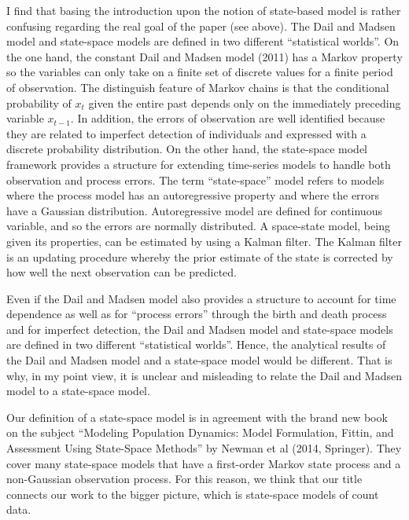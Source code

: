 \documentclass[12pt,english]{article}
\begin{document}
\begin{spacing}{1.9}
\begin{flushleft}
I find that basing the introduction upon the notion of state-based model is rather confusing
regarding the real goal of the paper (see above). The Dail and Madsen model and state-space
models are defined in two different ``statistical worlds''. On the one hand, the constant
Dail and Madsen model (2011) has a Markov property so the variables can only take on a
finite set of discrete values for a finite period of observation. The distinguish feature of
Markov chains is that the conditional probability of $x_{t}$ given the entire past depends only on
the immediately preceding variable $x_{t-1}$. In addition, the errors of observation are well
identified because they are related to imperfect detection of individuals and expressed with
a discrete probability distribution. On the other hand, the state-space model framework
provides a structure for extending time-series models to handle both observation and
process errors. The term ``state-space'' model refers to models where the process model has
an autoregressive property and where the errors have a Gaussian distribution.
Autoregressive model are defined for continuous variable, and so the errors are normally
distributed. A space-state model, being given its properties, can be estimated by using a
Kalman filter. The Kalman filter is an updating procedure whereby the prior estimate of the
state is corrected by how well the next observation can be predicted.

Even if the Dail and Madsen model also provides a structure to account for time dependence
as well as for ``process errors'' through the birth and death process and for imperfect
detection, the Dail and Madsen model and state-space models are defined in two different
``statistical worlds''. Hence, the analytical results of the Dail and Madsen model and a state-space
model would be different. That is why, in my point view, it is unclear and misleading to
relate the Dail and Madsen model to a state-space model.

\vspace{0.5cm}
Our definition of a state-space model is in agreement with the brand new
book on the subject ``Modeling Population Dynamics: Model Formulation,
Fittin, and Assessment Using State-Space Methods'' by Newman et
al (2014, Springer). They cover many state-space models that have
a first-order Markov state process and a non-Gaussian
observation process. For this reason, we think that our title connects
our work to the bigger picture, which is state-space
models of count data.  
\vspace{0.5cm}


\end{flushleft}
\end{spacing}
\end{document}
